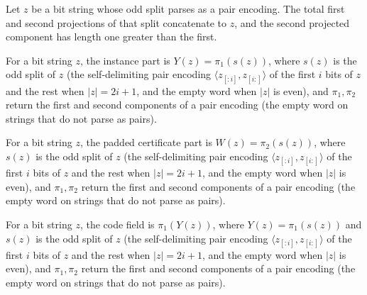 \begin{lemma}
\label{Complexity.tmsat_split_components}
\leanok
{}
Let $z$ be a bit string whose odd split parses as a pair encoding. The total first and
second projections of that split concatenate to $z$, and the second projected component
has length one greater than the first.
\end{lemma}

\begin{definition}
\label{Complexity.tmsatY}
\leanok
{}
For a bit string $z$, the instance part is $Y(z) = \pi_1(s(z))$, where $s(z)$ is the odd split of $z$ (the self-delimiting pair encoding $\langle z_{[:i]}, z_{[i:]}\rangle$ of the first $i$ bits of $z$ and the rest when $|z| = 2i+1$, and the empty word when $|z|$ is even), and $\pi_1, \pi_2$ return the first and second components of a pair encoding (the empty word on strings that do not parse as pairs).
\end{definition}

\begin{definition}
\label{Complexity.tmsatW}
\leanok
{}
For a bit string $z$, the padded certificate part is $W(z) = \pi_2(s(z))$, where $s(z)$ is the odd split of $z$ (the self-delimiting pair encoding $\langle z_{[:i]}, z_{[i:]}\rangle$ of the first $i$ bits of $z$ and the rest when $|z| = 2i+1$, and the empty word when $|z|$ is even), and $\pi_1, \pi_2$ return the first and second components of a pair encoding (the empty word on strings that do not parse as pairs).
\end{definition}

\begin{definition}
\label{Complexity.tmsatCode}
\leanok
{}
For a bit string $z$, the code field is $\pi_1(Y(z))$, where $Y(z) = \pi_1(s(z))$ and $s(z)$ is the odd split of $z$ (the self-delimiting pair encoding $\langle z_{[:i]}, z_{[i:]}\rangle$ of the first $i$ bits of $z$ and the rest when $|z| = 2i+1$, and the empty word when $|z|$ is even), and $\pi_1, \pi_2$ return the first and second components of a pair encoding (the empty word on strings that do not parse as pairs).
\end{definition}

